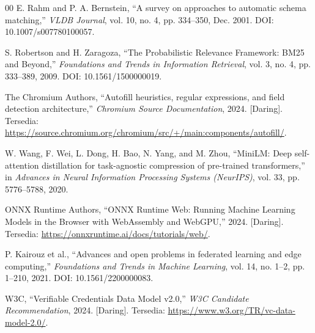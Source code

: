 \documentclass[conference]{IEEEtran}
\begin{document}
\begin{thebibliography}{00}
E. Rahm and P. A. Bernstein, ``A survey on approaches to automatic schema matching,'' \textit{VLDB Journal}, vol. 10, no. 4, pp. 334--350, Dec. 2001. DOI: 10.1007/s007780100057.

S. Robertson and H. Zaragoza, ``The Probabilistic Relevance Framework: BM25 and Beyond,'' \textit{Foundations and Trends in Information Retrieval}, vol. 3, no. 4, pp. 333--389, 2009. DOI: 10.1561/1500000019.

The Chromium Authors, ``Autofill heuristics, regular expressions, and field detection architecture,'' \textit{Chromium Source Documentation}, 2024. [Daring]. Tersedia: \url{https://source.chromium.org/chromium/src/+/main:components/autofill/}.

W. Wang, F. Wei, L. Dong, H. Bao, N. Yang, and M. Zhou, ``MiniLM: Deep self-attention distillation for task-agnostic compression of pre-trained transformers,'' in \textit{Advances in Neural Information Processing Systems (NeurIPS)}, vol. 33, pp. 5776--5788, 2020.

ONNX Runtime Authors, ``ONNX Runtime Web: Running Machine Learning Models in the Browser with WebAssembly and WebGPU,'' 2024. [Daring]. Tersedia: \url{https://onnxruntime.ai/docs/tutorials/web/}.

P. Kairouz et al., ``Advances and open problems in federated learning and edge computing,'' \textit{Foundations and Trends in Machine Learning}, vol. 14, no. 1--2, pp. 1--210, 2021. DOI: 10.1561/2200000083.

W3C, ``Verifiable Credentials Data Model v2.0,'' \textit{W3C Candidate Recommendation}, 2024. [Daring]. Tersedia: \url{https://www.w3.org/TR/vc-data-model-2.0/}.

\end{thebibliography}
\end{document}
